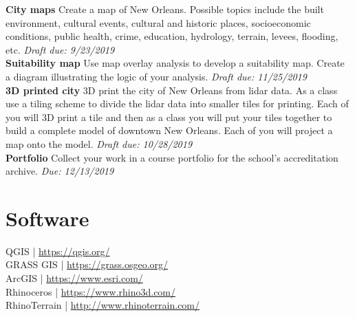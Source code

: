 \documentclass[11pt,article,oneside]{memoir}
\begin{document}
\noindent \textbf{City maps}
Create a map of New Orleans. 
Possible topics include the built environment, 
cultural events, cultural and historic places, 
socioeconomic conditions, public health, crime, education, 
hydrology, terrain, levees, flooding, etc.
\emph{Draft due: 9/23/2019}\\

\noindent \textbf{Suitability map}
Use map overlay analysis 
to develop a suitability map.
Create a diagram illustrating 
the logic of your analysis.
\emph{Draft due: 11/25/2019}\\

\noindent \textbf{3D printed city}
3D print the city of New Orleans from lidar data. 
As a class use a tiling scheme 
to divide the lidar data into smaller tiles for printing.
Each of you will 3D print a tile and then
as a class you will put your tiles together 
to build a complete model of downtown New Orleans.
Each of you will project a map onto the model.
\emph{Draft due: 10/28/2019}\\

\noindent \textbf{Portfolio}
Collect your work in a course portfolio 
for the school's accreditation archive.
\emph{Due: 12/13/2019}\\

\clearpage

\section{Software}
\begin{multicols}{2}
\raggedright
QGIS | \url{https://qgis.org/}\\
GRASS GIS | \url{https://grass.osgeo.org/}\\
ArcGIS | \url{https://www.esri.com/}\\
Rhinoceros | \url{https://www.rhino3d.com/}\\
RhinoTerrain | \url{http://www.rhinoterrain.com/}\\
\end{multicols}

\end{document}
